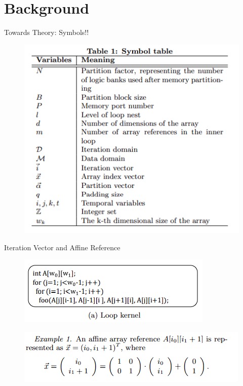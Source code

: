 \documentclass[xcolor=dvipsnames]{beamer}
\begin{document}
    \section{Background}
    \begin{frame}{Towards Theory: Symbols!!}

        \begin{figure}
            \includegraphics[scale=0.8]{MathSymb.PNG}
        \end{figure}
        
    \end{frame}

    \begin{frame}{Iteration Vector and Affine Reference}

        \begin{figure}
            \includegraphics{LoopExample.PNG}
        \end{figure}

        \begin{figure}
            \includegraphics{AffineRef.PNG}
        \end{figure}
        
    \end{frame}
\end{document}
